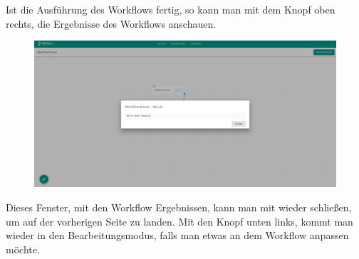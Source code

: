     Ist die Ausführung des Workflows fertig, so kann man mit dem Knopf oben rechts, die Ergebnisse des Workflows anschauen. 
    \begin{figure}[H]
        \centering
        \includegraphics[width=15.5cm]{images/Workflow Result.png}
        \label{workflow_result}
    \end{figure}
    Dieses Fenster, mit den Workflow Ergebnissen, kann man mit wieder schließen, um auf der vorherigen Seite zu landen. Mit den Knopf unten links, kommt man wieder in den Bearbeitungsmodus, falls man etwas an dem Workflow anpassen möchte.
    
